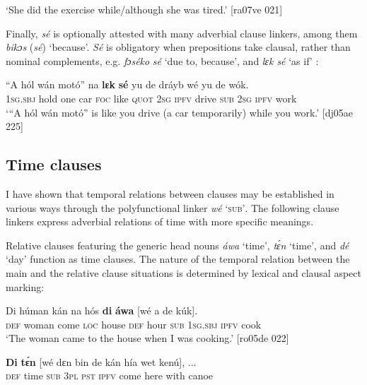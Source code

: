 \glt ‘She did the exercise while/although she was tired.’ [ra07ve 021]
\z

Finally, \textit{sé} is optionally attested with many adverbial clause linkers, among them \textit{bikɔs} (\textit{sé}) ‘because’. \textit{Sé} is obligatory when prepositions take clausal, rather than nominal complements, e.g. \textit{fɔséko} \textit{sé} ‘due to, because’, and \textit{lɛk sé} ‘as if’ :


\ea%
    \label{ex:key:1471}
    \gll “A    hól    wán    motó”  na  \textbf{lɛk}  \textbf{sé}    yu  de  dráyb
wé  yu  de  wók.\\
\phantom{“}\textsc{1sg.sbj}  hold    one    car    \textsc{foc}  like  \textsc{quot}    \textsc{2sg}  \textsc{ipfv}  drive
\textsc{sub}  \textsc{2sg}  \textsc{ipfv}  work\\

\glt ‘“A hól wán motó” is like you drive (a car temporarily) while you work.’ [dj05ae 225]
\z

\subsection{Time clauses}\label{sec:10.7.3}

I have shown that temporal relations between clauses may be established in various ways through the polyfunctional linker \textit{wé} ‘\textsc{sub’}. The following clause linkers express adverbial relations of time with more specific meanings. 


Relative clause{\fff}s featuring the generic head nouns \textit{áwa} ‘time’, \textit{tɛ́n} ‘time’, and \textit{dé} ‘day’ function as time clauses. The nature of the temporal relation between the main and the relative clause situations is determined by lexical and clausal aspect marking:



\ea%
    \label{ex:key:1472}
    \gll Di  húman  kán    na  hós    \textbf{di}  \textbf{áwa}    [wé  a    de  kúk].\\
\textsc{def}  woman  come  \textsc{loc}  house  \textsc{def}  hour   \phantom{[}\textsc{sub}  \textsc{1sg.sbj}  \textsc{ipfv}  cook\\

\glt ‘The woman came to the house when I was cooking.’ [ro05de 022]
\z


\ea%
    \label{ex:key:1473}
    \gll \textbf{Di}  \textbf{tɛ́n}    [wé  dɛn  bin  de  kán    hía    wet    kenú],  \op...\cp{}\\
\textsc{def}  time    \phantom{[}\textsc{sub}  \textsc{3pl}  \textsc{pst}  \textsc{ipfv}  come  here    with    canoe\\

